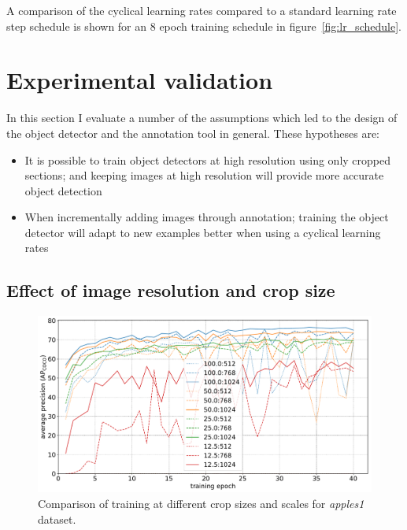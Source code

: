 A comparison of the cyclical learning rates compared to a standard learning rate step schedule is shown for an $8$ epoch training schedule in figure~\ref{fig:lr_schedule}.

\section {Experimental validation}
\label{sec:experimental_validation}

In this section I evaluate a number of the assumptions which led to the design of the object detector and the annotation tool in general. These hypotheses are:

\begin{itemize}
    \item {It is possible to train object detectors at high resolution using only cropped sections; and keeping images at high resolution will provide more accurate object detection}
    \item {When incrementally adding images through annotation; training the object detector will adapt to new examples better when using a cyclical learning rates}    
\end{itemize} 


\subsection {Effect of image resolution and crop size}
\label{sec:scale_crop}


\begin{figure}[h]
  \centering
  \includegraphics[width=1.0\linewidth]{charts/training/crops_scales/penguins.pdf}
  \caption{Comparison of training at different crop sizes and scales for \emph{apples1} dataset. }  
  \label{fig:apples_crop_scale}
\end{figure}


